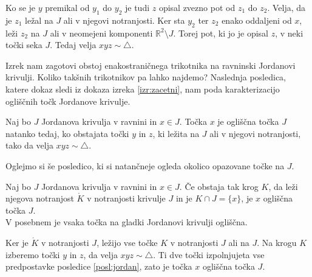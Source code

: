 \documentclass[mat1]{fmfdelo}
\newcommand{\R}{\mathbb R}
\begin{document}
Ko se je $y$ premikal od $y_1$ do $y_2$ je tudi $z$ opisal zvezno pot od $z_1$ do $z_2$. Velja, da je $z_1$ ležal na $J$ ali v njegovi notranjosti. Ker sta $y_2$ ter $z_2$ enako oddaljeni od $x$, leži $z_2$ na $J$ ali v neomejeni komponenti $\R^2 \setminus J$. Torej pot, ki jo je opisal $z$, v neki točki seka $J$. Tedaj velja $xyz \sim \triangle$.

\begin{center}
\end{center}
\endproof

Izrek nam zagotovi obstoj enakostraničnega trikotnika na ravninski Jordanovi krivulji. Koliko takšnih trikotnikov pa lahko najdemo? Naslednja posledica, katere dokaz sledi iz dokaza izreka \ref{izr:zacetni}, nam poda karakterizacijo ogliščnih točk Jordanove krivulje.
\begin{posledica}\label{posl:jordan}
Naj bo $J$ Jordanova krivulja v ravnini in $x \in J$. Točka $x$ je ogliščna točka $J$ natanko tedaj, ko obstajata točki $y$ in $z$, ki ležita na $J$ ali v njegovi notranjosti, tako da velja $xyz \sim \triangle$.
\end{posledica}

Oglejmo si še posledico, ki si natančneje ogleda okolico opazovane točke na $J$.
\begin{posledica}
Naj bo $J$ Jordanova krivulja v ravnini in $x \in J$. Če obstaja tak krog $K$, da leži njegova notranjost $\mathring{K}$ v notranjosti krivulje $J$ in je $K \cap J = \{x\}$, je $x$ ogliščna točka $J$.\\
V posebnem je vsaka točka na gladki Jordanovi krivulji ogliščna.
\end{posledica}
\proof
Ker je $\mathring{K}$ v notranjosti $J$, ležijo vse točke $K$ v notranjosti $J$ ali na $J$. Na krogu $K$ izberemo točki $y$ in $z$, da velja $xyz \sim \triangle$. Ti dve točki izpolnjujeta vse predpostavke posledice \ref{posl:jordan}, zato je točka $x$ ogliščna točka $J$.
\endproof
\end{document}
